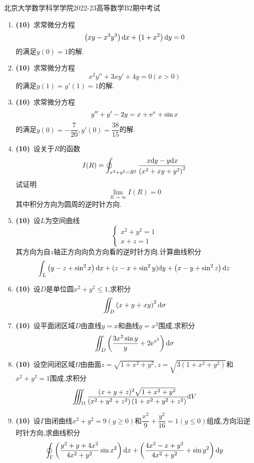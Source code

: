 \documentclass{ctexart}
\begin{document}
\pagestyle{empty}
\begin{center}\Large
    北京大学数学科学学院2022-23高等数学B2期中考试
\end{center}
\begin{enumerate}[leftmargin=*,label=\textbf{\arabic*.}]
    \item \textbf{(10)}\ 求常微分方程
        \[\left(xy-x^3y^3\right)\mathrm{d} x+\left(1+x^2\right)\mathrm{d} y=0\]
        的满足$y(0)=1$的解.
    \item \textbf{(10)}\ 求常微分方程
        \[x^2y''+3xy'+4y=0(x>0)\]
        的满足$y(1)=y'(1)=1$的解.
    \item \textbf{(10)}\ 求常微分方程
        \[y''+y'-2y=x+\mathrm{e}^x+\sin x\]
        的满足$y(0)=-\dfrac{7}{20},y'(0)=\dfrac{38}{15}$的解.
    \item \textbf{(10)}\ 设关于$R$的函数
        \[I(R)=\oint_{x^2+y^2=R^2}\dfrac{x\mathrm{d} y-y\mathrm{d} x}{\left(x^2+xy+y^2\right)^2}\]
        试证明
        \[\lim_{R\to\infty}I(R)=0\]
        其中积分方向为圆周的逆时针方向.
    \item \textbf{(10)}\ 设$L$为空间曲线
        \[\left\{\begin{array}{l}
            x^2+y^2=1\\
            x+z=1
        \end{array}\right.\]
        其方向为自$z$轴正方向向负方向看的逆时针方向.计算曲线积分
        \[\int_{L}\left(y-z+\sin^2x\right)\mathrm{d} x+(z-x+\sin^2y)\mathrm{d} y+\left(x-y+\sin^2z\right)\mathrm{d} z\]

    \item \textbf{(10)}\ 设$D$是单位圆$x^2+y^2\leqslant1$,求积分
        \[\iint_D\left(x+y+xy\right)^2\mathrm{d}\sigma\]

    \item \textbf{(10)}\ 设平面闭区域$D$由直线$y=x$和曲线$y=x^3$围成,求积分
        \[\iint_D\left(\dfrac{3x^2\sin y}{y}+2\mathrm{e}^{x^2}\right)\mathrm{d}\sigma\]

    \item \textbf{(10)}\ 设空间闭区域$\Omega$由曲面$z=\sqrt{1+x^2+y^2},z=\sqrt{3\left(1+x^2+y^2\right)}$和$x^2+y^2=1$围成,求积分
        \[\iiint_{\Omega}\dfrac{(x+y+z)^2\sqrt{1+x^2+y^2}}{\left(x^2+y^2+z^2\right)\left(1+x^2+y^2+z^2\right)}\mathrm{d} V\]

    \item \textbf{(10)}\ 设$\Gamma$由闭曲线$x^2+y^2=9(y\geqslant0)$和$\dfrac{x^2}{9}+\dfrac{y^2}{16}=1(y\leqslant0)$组成,方向沿逆时针方向,求曲线积分
        \[\oint_{\Gamma}\left(\dfrac{y^2+y+4x^2}{4x^2+y^2}\sin x^2\right)\mathrm{d} x+\left(\dfrac{4x^2-x+y^2}{4x^2+y^2}+\sin y^2\right)\mathrm{d} y\]
    

\end{enumerate}
\end{document}
